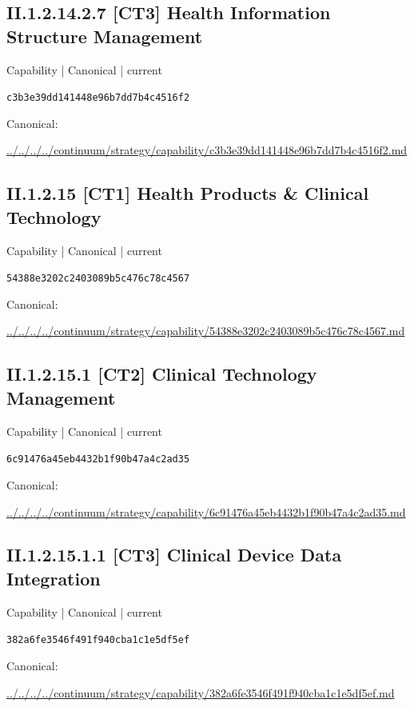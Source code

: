 \documentclass[10pt,a4paper]{article}
\begin{document}
\subsection*{II.1.2.14.2.7 [CT3] Health Information Structure Management}
{\small Capability | Canonical | current}\par
\texttt{c3b3e39dd141448e96b7dd7b4c4516f2}\par
Canonical: \par
{\footnotesize\url{../../../../continuum/strategy/capability/c3b3e39dd141448e96b7dd7b4c4516f2.md}}\par
\subsection*{II.1.2.15 [CT1] Health Products \& Clinical Technology}
{\small Capability | Canonical | current}\par
\texttt{54388e3202c2403089b5c476c78c4567}\par
Canonical: \par
{\footnotesize\url{../../../../continuum/strategy/capability/54388e3202c2403089b5c476c78c4567.md}}\par
\subsection*{II.1.2.15.1 [CT2] Clinical Technology Management}
{\small Capability | Canonical | current}\par
\texttt{6c91476a45eb4432b1f90b47a4c2ad35}\par
Canonical: \par
{\footnotesize\url{../../../../continuum/strategy/capability/6c91476a45eb4432b1f90b47a4c2ad35.md}}\par
\subsection*{II.1.2.15.1.1 [CT3] Clinical Device Data Integration}
{\small Capability | Canonical | current}\par
\texttt{382a6fe3546f491f940cba1c1e5df5ef}\par
Canonical: \par
{\footnotesize\url{../../../../continuum/strategy/capability/382a6fe3546f491f940cba1c1e5df5ef.md}}\par
\end{document}

